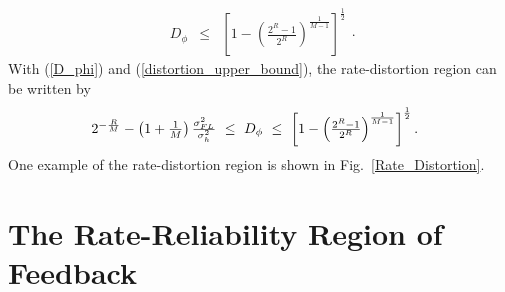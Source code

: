 \documentclass[10pt,fleqn, twocolumn]{IEEEtran}
\begin{document}
\begin{equation}
\begin{array}{rcl}
D_{\phi}&\leq&\left[1-\left(\frac{2^{R}-1}{2^R}\right)^{\frac{1}{M-1}}\right]^{\frac{1}{2}}
\end{array}.\label{distortion_upper_bound}
\end{equation}
\noindent With (\ref{D_phi}) and (\ref{distortion_upper_bound}),
the rate-distortion region can be written by
\begin{equation}\hspace{-0.10in}
\begin{array}{l}
2^{-\frac{R}{M}}-\left(1+\frac{1}{M}\right)\frac{\sigma_{\mbox{\tiny
FL}}^{2}}{\sigma_{h}^{2}}\ \leq\ D_{\phi}\ \leq\
\left[1-\left(\frac{2^{R}-1}{2^R}\right)^{\frac{1}{M-1}}\right]^{\frac{1}{2}}.
\end{array}
\end{equation}
\noindent One example of the rate-distortion region is shown in
Fig.~\ref{Rate_Distortion}.
\begin{figure}
\end{figure}


\section{The Rate-Reliability Region of Feedback}
\end{document}
